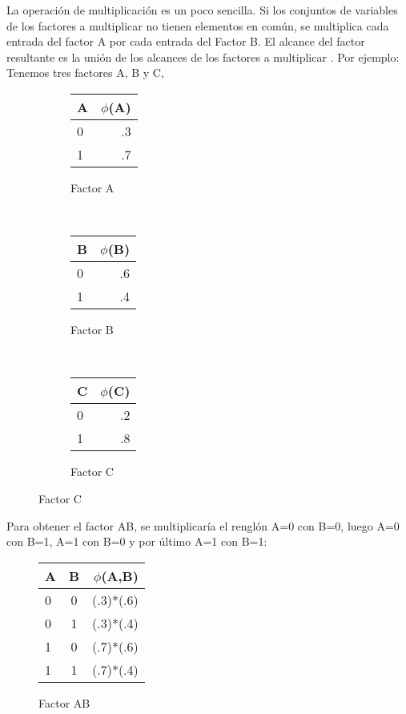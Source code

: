 La operación de multiplicación es un poco sencilla. Si los conjuntos de variables de los factores a multiplicar no tienen elementos en común, se multiplica cada entrada del factor A por cada entrada del Factor B. El alcance del factor resultante es la unión de los alcances de los factores a multiplicar \parencite[107]{KollerFriedman2009}. Por ejemplo: Tenemos tres factores A, B y C,


\begin{figure}
    \centering
    \begin{subfigure}[b]{0.3\textwidth}
        \centering
        \begin{tabular}{ l | r }
          A & $\phi$(A)\\ \hline
          0 & .3  \\ \hline
          1 & .7  \\
        \end{tabular}
        \caption{Factor A}
    \end{subfigure}
    ~ 
    \begin{subfigure}[b]{0.3\textwidth}
        \centering
        \begin{tabular}{ l | r }
          B & $\phi$(B)\\ \hline
          0 & .6  \\ \hline
          1 & .4  \\
        \end{tabular}
        \caption{Factor B}
    \end{subfigure}
    ~
    \begin{subfigure}[b]{0.3\textwidth}
        \centering
        \begin{tabular}{ l | r }
          C & $\phi$(C)\\ \hline
          0 & .2  \\ \hline
          1 & .8  \\
        \end{tabular}
        \caption{Factor C}
    \end{subfigure}
\end{figure}

\noindent Para obtener el factor AB, se multiplicaría el renglón A=0 con B=0, luego A=0 con B=1, A=1 con B=0 y por último A=1 con B=1:

\begin{figure}[H]
  \begin{center}
    \begin{tabular}{ l  c | r }
      A & B & $\phi$(A,B)\\ \hline
      0 & 0 & (.3)*(.6)  \\ \hline
      0 & 1 & (.3)*(.4)  \\ \hline
      1 & 0 & (.7)*(.6)  \\ \hline
      1 & 1 & (.7)*(.4)  \\
    \end{tabular}
  \end{center}
  \caption{Factor AB}
\end{figure}

